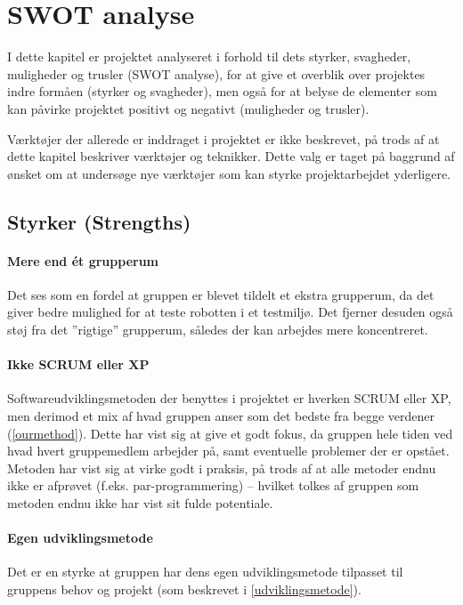\section{SWOT analyse}\label{swot:analyse}
I dette kapitel er projektet analyseret i forhold til dets styrker, svagheder, muligheder og trusler (SWOT analyse), for at give et overblik over projektes indre formåen (styrker og svagheder), men også for at belyse de elementer som kan påvirke projektet positivt og negativt (muligheder og trusler).

Værktøjer der allerede er inddraget i projektet er ikke beskrevet, på trods af at dette kapitel beskriver værktøjer og teknikker.
Dette valg er taget på baggrund af ønsket om at undersøge nye værktøjer som kan styrke projektarbejdet yderligere.

\subsection{Styrker \textnormal{(\textbf{S}trengths)}}

\paragraph{Mere end ét grupperum}
Det ses som en fordel at gruppen er blevet tildelt et ekstra grupperum, da det giver bedre mulighed for at teste robotten i et testmiljø.
Det fjerner desuden også støj fra det ''rigtige'' grupperum, således der kan arbejdes mere koncentreret.

\paragraph{Ikke SCRUM eller XP}
Softwareudviklingsmetoden der benyttes i projektet er hverken SCRUM eller XP, men derimod et mix af hvad gruppen anser som det bedste fra begge verdener (\cref{ourmethod}).
Dette har vist sig at give et godt fokus, da gruppen hele tiden ved hvad hvert gruppemedlem arbejder på, samt eventuelle problemer der er opstået.
Metoden har vist sig at virke godt i praksis, på trods af at alle metoder endnu ikke er afprøvet (f.eks. par-programmering) -- hvilket tolkes af gruppen som metoden endnu ikke har vist sit fulde potentiale.

\paragraph{Egen udviklingsmetode}
Det er en styrke at gruppen har dens egen udviklingsmetode tilpasset til gruppens behov og projekt (som beskrevet i \cref{udviklingsmetode}).

